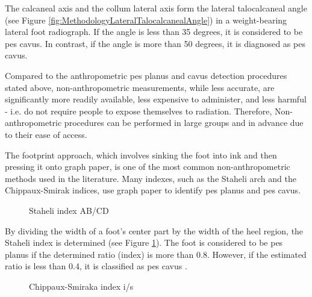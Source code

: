 The calcaneal axis and the collum lateral axis form the lateral talocalcaneal angle (see Figure \ref{fig:MethodologyLateralTalocalcanealAngle}) in a weight-bearing lateral foot radiograph.  If the angle is less than 35 degrees, it is considered to be pes cavus.  In contrast, if the angle is more than 50 degrees, it is diagnosed as pes cavus.

Compared to the anthropometric pes planus and cavus detection procedures stated above, non-anthropometric measurements, while less accurate, are significantly more readily available, less expensive to administer, and less harmful - i.e. do not require people to expose themselves to radiation. Therefore, Non-anthropometric procedures can be performed in large groups and in advance due to their ease of access.

The footprint approach, which involves sinking the foot into ink and then pressing it onto graph paper, is one of the most common non-anthropometric methods used in the literature. Many indexes, such as the Staheli arch and the Chippaux-Smirak indices, use graph paper to identify pes planus and pes cavus.

\begin{figure}[htbp]
\centering
{}
\caption{Staheli index AB/CD \cite{radiopaediamearysangle}}
\label{fig:MethodologyStaheliIndex}
\end{figure}

By dividing the width of a foot's center part by the width of the heel region, the Staheli index is determined (see Figure \ref{fig:MethodologyStaheliIndex}). The foot is considered to be pes planus if the determined ratio (index) is more than 0.8. However, if the estimated ratio is less than 0.4, it is classified as pes cavus \cite{almaawi2019flatfoot}.

\begin{figure}[htbp]
\centering
{}
\caption{Chippaux-Smiraka index i/s \cite{radiopaediamearysangle}}
\label{fig:MethodologyChippauxSmirakaIndex}
\end{figure}

